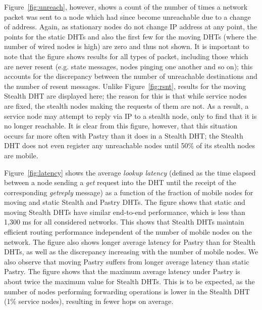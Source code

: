 \documentclass[times, 10pt,twocolumn]{article}
\begin{document}
Figure~\ref{fig:unreach}, however, shows a count of the number of
times a network packet was sent to a node which had since become
unreachable due to a change of address. Again, as stationary nodes
do not change IP address at any point, the points for the static
DHTs and also the first few for the moving DHTs (where the number of
wired nodes is high) are zero and thus not shown. It is important to
note that the figure shows results for all types of packet,
including those which are never resent (e.g. state messages, nodes
pinging one another and so on); this accounts for the discrepancy
between the number of unreachable destinations and the number of
resent messages. Unlike Figure~\ref{fig:rsnt}, results for the
moving Stealth DHT are displayed here; the reason for this is that
while service nodes are fixed, the stealth nodes making the requests
of them are not. As a result, a service node may attempt to reply
via IP to a stealth node, only to find that it is no longer
reachable. It is clear from this figure, however, that this
situation occurs far more often with Pastry than it does in a
Stealth DHT; the Stealth DHT does not even register any unreachable
nodes until 50\% of its stealth nodes are mobile.

 \label{subsect:latency}


Figure~\ref{fig:latency} shows the average {\em lookup latency}
(defined as the time elapsed between a node sending a {\em get}
request into the DHT until the receipt of the corresponding {\em
getreply} message) as a function of the fraction of mobile nodes for
moving and static Stealth and Pastry DHTs. The figure shows that
static and moving Stealth DHTs have similar end-to-end performance,
which is less than 1,300 ms for all considered networks. This shows
that Stealth DHTs maintain efficient routing performance independent
of the number of mobile nodes on the network.  The figure also shows
longer average latency for Pastry than for Stealth DHTs, as well as
the discrepancy increasing with the number of mobile nodes. We also
observe that moving Pastry suffers from longer average latency than
static Pastry. The figure shows that the maximum average latency
under Pastry is about twice the maximum value for Stealth DHTs. This
is to be expected, as the number of nodes performing forwarding
operations is lower in the Stealth DHT (1\% service nodes),
resulting in fewer hops on average.
\end{document}
